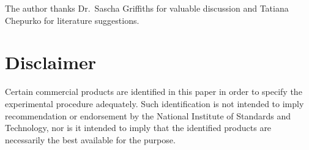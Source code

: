 \documentclass[11pt,a4paper]{article}
\begin{document}
The author thanks Dr.~Sascha Griffiths for valuable discussion and Tatiana Chepurko for literature suggestions.

\section*{Disclaimer}

Certain commercial products are identified in this paper in order to specify the experimental procedure adequately. Such identification is not intended to imply recommendation or endorsement by the National Institute of Standards and Technology, nor is it intended to imply that the identified products are necessarily the best available for the purpose.

\balance



\end{document}
